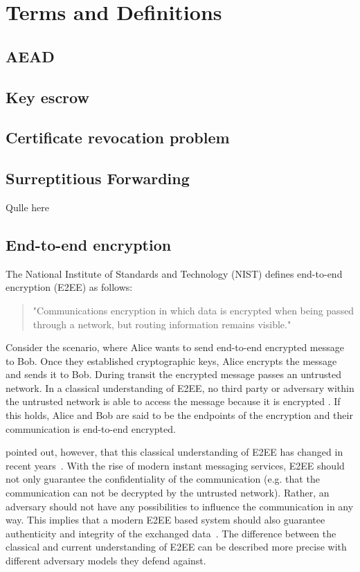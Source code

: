 \documentclass[../main.tex]{subfiles}
\begin{document}
\chapter{Terms and Definitions}
\section{AEAD}
\label{sec:aead}

\section{Key escrow}
\label{sec:key-escrow}

\section{Certificate revocation problem}
\label{sec:crp}

\section{Surreptitious Forwarding}
\label{sec:surreptitious-forwarding}
Qulle here~\cite{Davis2001}

\section{End-to-end encryption} 
\label{sec:end-to-end}

The National Institute of Standards and Technology (NIST) defines end-to-end encryption (E2EE) as follows:
\begin{quote}
"Communications encryption in which data is encrypted when being passed through a network, but routing information remains visible."~\cite[88]{Nieles2017}
\end{quote}
Consider the scenario, where Alice wants to send end-to-end encrypted message to Bob.
Once they established cryptographic keys, Alice encrypts the message and sends it to Bob.
During transit the encrypted message passes an untrusted network.
In a classical understanding of E2EE, no third party or adversary within the untrusted network is able to access the message because it is encrypted \cite{Ermoshina2016}.
If this holds, Alice and Bob are said to be the endpoints of the encryption and their communication is end-to-end encrypted.

\citeauthor{Hale2022} pointed out, however, that this classical understanding of E2EE has changed in recent years~\cite{Hale2022}. 
With the rise of modern instant messaging services, E2EE should not only guarantee the confidentiality of the communication (e.g. that the communication can not be decrypted by the untrusted network).
Rather, an adversary should not have any possibilities to influence the communication in any way.
This implies that a modern E2EE based system should also guarantee authenticity and integrity of the exchanged data~\cite{Hale2022}. 
The difference between the classical and current understanding of E2EE can be described more precise with different adversary models they defend against.
\end{document}
